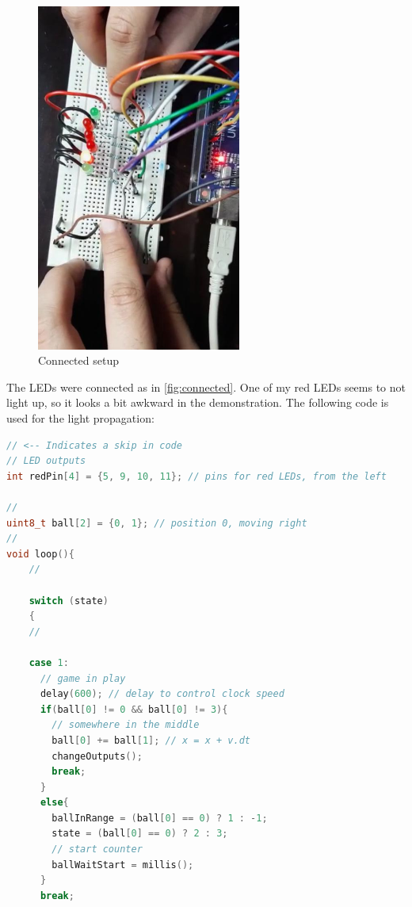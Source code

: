\begin{arabicparts}
    \begin{figure}[ht]
        \centering
        \includegraphics[width=0.6\textwidth, angle=90]{fig/arduinoconnected-min.jpg}
        \caption{Connected setup}
        \label{fig:connected}
    \end{figure}

    \questionpart The LEDs were connected as in \autoref{fig:connected}. One of
    my red LEDs seems to not light up, so it looks a bit awkward in the
    demonstration. The following code is used for the light propagation:

    \begin{lstlisting}[language=C++]
// <-- Indicates a skip in code
// LED outputs
int redPin[4] = {5, 9, 10, 11}; // pins for red LEDs, from the left

//
uint8_t ball[2] = {0, 1}; // position 0, moving right
//
void loop(){
    //

    switch (state)
    {
    //

    case 1:
      // game in play
      delay(600); // delay to control clock speed
      if(ball[0] != 0 && ball[0] != 3){
        // somewhere in the middle
        ball[0] += ball[1]; // x = x + v.dt
        changeOutputs();
        break;
      }
      else{
        ballInRange = (ball[0] == 0) ? 1 : -1;
        state = (ball[0] == 0) ? 2 : 3;
        // start counter
        ballWaitStart = millis();
      }
      break;
    

\end{lstlisting}
\end{arabicparts}
